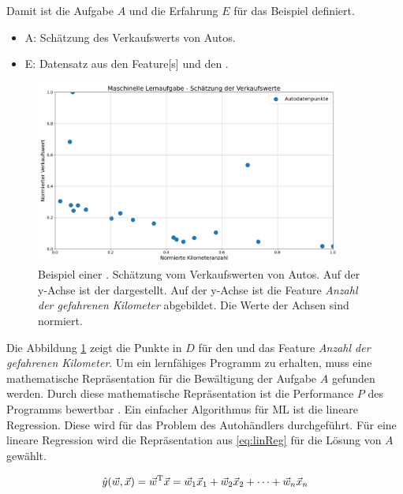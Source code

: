 Damit ist die Aufgabe \(A\) und die Erfahrung \(E\) für das Beispiel definiert. 

\begin{itemize}
    \item A: Schätzung des Verkaufswerts von Autos.
    \item E: Datensatz aus den \gls{Feature}[s] und den .
\end{itemize}

\begin{figure}[htb]
    \centering
    \includegraphics[width=0.9\textwidth]{img/Autohändlerbsp/Schätzung der Verkaufswerte.png}
    \caption[Beispiel einer maschinellen Lernaufgabe.]{Beispiel einer . Schätzung vom Verkaufswerten von Autos. Auf der y-Achse ist der  dargestellt. Auf der y-Achse ist die \gls{Feature} \textit{Anzahl der gefahrenen Kilometer} abgebildet. Die Werte der Achsen sind normiert.}
    \label{fig:BspMLAuto}
\end{figure}


Die Abbildung \ref{fig:BspMLAuto} zeigt die Punkte in \(D\) für den  und das \gls{Feature} \textit{Anzahl der gefahrenen Kilometer}. Um ein lernfähiges Programm zu erhalten, muss eine mathematische Repräsentation für die Bewältigung der Aufgabe \(A\) gefunden werden. Durch diese mathematische Repräsentation ist die Performance \(P\) des Programms bewertbar \cite{Mitchell.1997}. Ein einfacher Algorithmus für \gls{ML} ist die lineare Regression. Diese wird für das Problem des Autohändlers durchgeführt. Für eine lineare Regression wird die Repräsentation aus \autoref{eq:linReg} für die Lösung von \(A\) gewählt.

\begin{equation}
    \label{eq:linReg}
    \hat{y}(\vec{w}, \vec{x}) =  \vec{w}^\mathrm{T}\vec{x} = \vec{w}_1\vec{x}_1 + \vec{w}_2\vec{x}_2 + \dots + \vec{w}_n\vec{x}_n
\end{equation}


